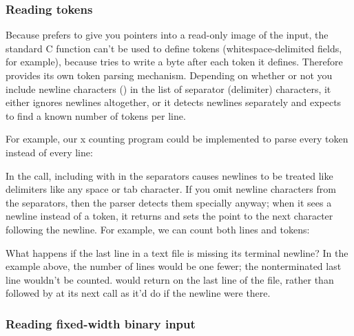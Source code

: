 \subsubsection{Reading tokens}

Because  prefers to give you pointers into a
read-only image of the input, the standard C  function
can't be used to define tokens (whitespace-delimited fields, for
example), because  tries to write a \ccode{\0} byte
after each token it defines. Therefore  provides
its own token parsing mechanism. Depending on whether or not you
include newline characters (\ccode{\r\n}) in the list of separator
(delimiter) characters, it either ignores newlines altogether, or it
detects newlines separately and expects to find a known number of
tokens per line.

For example, our x counting program could be implemented to parse
every token instead of every line:




In the  call, including \ccode{\r\n}
with \ccode{ \t} in the separators causes newlines to be treated like
delimiters like any space or tab character. If you omit \ccode{\r\n}
newline characters from the separators, then the parser detects them
specially anyway; when it sees a newline instead of a token, it
returns  and sets the point to the next character
following the newline. For example, we can count both lines and
tokens:




What happens if the last line in a text file is missing its terminal
newline? In the example above, the number of lines would be one fewer;
the nonterminated last line wouldn't be
counted.  would return 
on the last line of the file, rather than  followed by
 at its next call as it'd do if the newline were there.


\subsubsection{Reading fixed-width binary input}

